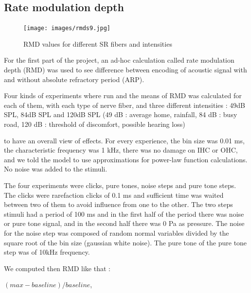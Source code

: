 
\subsection{Rate modulation depth}

\begin{figure}[ht]
	\centering
  \texttt{[image: images/rmds9.jpg]}
	\caption{RMD values for different SR fibers and intensities}
	\label{fig:rmds}
\end{figure}

For the first part of the project, an ad-hoc calculation called rate 
modulation depth (RMD) was used to see difference between encoding 
of acoustic signal with and without absolute refractory period (ARP).

Four kinds of experiments where run and the means of RMD was calculated 
for each of them, 
with each type of nerve fiber, and three different intensities : 
49dB SPL, 84dB SPL and 120dB SPL (49 dB : average home, rainfall, 84 dB : busy road, 120 dB : threshold of discomfort, possible hearing loss) 

to have an overall view of effects.
For every experience, the bin size was 0.01 ms, the characteristic frequency was 1 kHz, 
there was no damage on IHC or OHC, and we told the model to use approximations 
for power-law function calculations. No noise was added to the stimuli.

The four experiments were clicks, pure tones, noise steps and pure tone steps.
The clicks were rarefaction clicks of 0.1 ms and sufficient time was waited between 
two of them to avoid influence from one to the other.
The two steps stimuli had a period of 100 ms and in the first half of the period 
there was noise or pure tone signal, and in the second half there was 0 Pa as pressure.
The noise for the noise step was composed of random normal variables divided 
by the square root of the bin size (gaussian white noise).
The pure tone of the pure tone step was of 10kHz frequency.

We computed then RMD like that : 

$(max - baseline) / baseline$,

